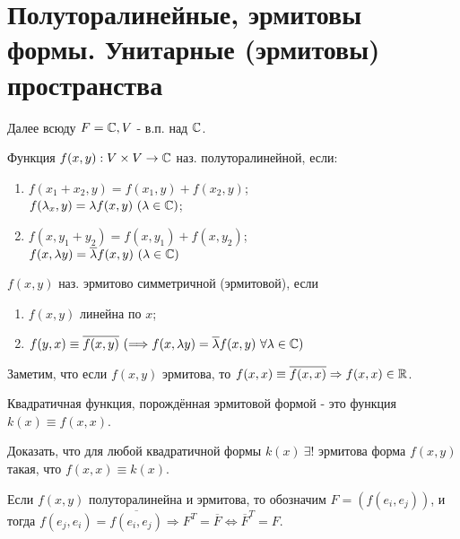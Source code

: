 \section{Полуторалинейные, эрмитовы формы. Унитарные (эрмитовы) пространства}
Далее всюду $F = \mathbb{C}, V$ - в.п. над $\mathbb{C}$.
\begin{definition}
    Функция $f(x, y): V\times V \rightarrow \mathbb{C}$ наз. полуторалинейной, если:
    \begin{enumerate}
        \item $f(x_1 + x_2, y) = f(x_1, y) + f(x_2, y)$;\\
              $f(\lambda_x, y) = \lambda f(x, y) \ (\lambda \in \mathbb{C})$;
        \item $f(x, y_1 + y_2) = f(x, y_1) + f(x, y_2)$;\\
              $f(x, \lambda y) = \overline{\lambda} f(x, y) \ (\lambda \in \mathbb{C})$
    \end{enumerate}
\end{definition}
\begin{definition}
    $f(x,y)$ наз. эрмитово симметричной (эрмитовой), если 
    \begin{enumerate}
        \item $f(x, y)$ линейна по $x$;
        \item $f(y, x) \equiv \overline{f(x,y)} \ (\Longrightarrow f(x, \lambda y) = \overline{\lambda}f(x,y) \ \forall \lambda \in \CC)$
    \end{enumerate}
\end{definition}
Заметим, что если $f(x,y)$ эрмитова, то $f(x, x) \equiv \overline{f(x,x)} \Rightarrow f(x,x) \in \mathbb{R}$.
\begin{definition}
    Квадратичная функция, порождённая эрмитовой формой - это функция $k(x) \equiv f(x,x)$.
\end{definition}
\begin{exercise}
    Доказать, что для любой квадратичной формы $k(x) \ \exists!$ эрмитова форма $f(x, y)$ такая, что $f(x,x) \equiv k(x)$. 
\end{exercise}
Если $f(x,y)$ полуторалинейна и эрмитова, то обозначим $F = (f(e_i, e_j))$, и тогда $f(e_j, e_i) = \overline{f(e_i, e_j)} \Longrightarrow F^T = \overline{F} \Longleftrightarrow \overline{F}^T = F$.
